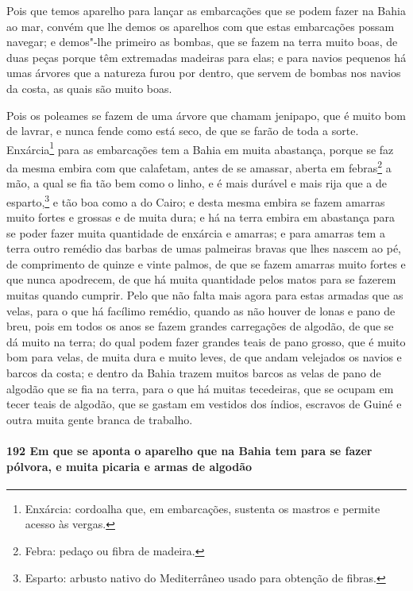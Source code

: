 Pois que temos aparelho para lançar as embarcações que se podem fazer na Bahia ao mar,
convém que lhe demos os aparelhos com que estas embarcações possam navegar; e demos"-lhe
primeiro as bombas, que se fazem na terra muito boas, de duas peças porque têm extremadas
madeiras para elas; e para navios pequenos há umas árvores que a natureza furou por
dentro, que servem de bombas nos navios da costa, as quais são muito boas.

Pois os poleames se fazem de uma árvore que chamam jenipapo, que é muito bom de lavrar, e
nunca fende como está seco, de que se farão de toda a sorte. Enxárcia\footnote{ Enxárcia:
cordoalha que, em embarcações, sustenta os mastros e permite acesso às vergas.} para as
embarcações tem a Bahia em muita abastança, porque se faz da mesma embira com que
calafetam, antes de se amassar, aberta em febras\footnote{ Febra: pedaço ou fibra de
madeira.} a mão, a qual se fia tão bem como o linho, e é mais durável e mais rija que a de
esparto,\footnote{ Esparto: arbusto nativo do Mediterrâneo usado para obtenção de fibras.}
e tão boa como a do Cairo; e desta mesma embira se fazem amarras muito fortes e grossas e
de muita dura; e há na terra embira em abastança para se poder fazer muita quantidade de
enxárcia e amarras; e para amarras tem a terra outro remédio das barbas de umas palmeiras
bravas que lhes nascem ao pé, de comprimento de quinze e vinte palmos, de que se fazem
amarras muito fortes e que nunca apodrecem, de que há muita quantidade pelos matos para se
fazerem muitas quando cumprir. Pelo que não falta mais agora para estas armadas que as
velas, para o que há facílimo remédio, quando as não houver de lonas e pano de breu, pois
em todos os anos se fazem grandes carregações de algodão, de que se dá muito na terra; do
qual podem fazer grandes teais de pano grosso, que é muito bom para velas, de muita dura e
muito leves, de que andam velejados os navios e barcos da costa; e dentro da Bahia trazem
muitos barcos as velas de pano de algodão que se fia na terra, para o que há muitas
tecedeiras, que se ocupam em tecer teais de algodão, que se gastam em vestidos dos índios,
escravos de Guiné e outra muita gente branca de trabalho.

\paragraph{192 Em que se aponta o aparelho que na Bahia tem para se fazer pólvora, e muita
picaria e armas de algodão}

